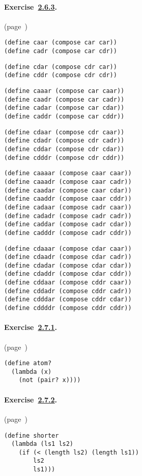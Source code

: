 \paragraph{Exercise \hyperref[start_g28]{2.6.3}. }(page \pageref{start_s96})

  
\begin{alltt}
 (define caar (compose car car))
 (define cadr (compose car cdr)) 

(define cdar (compose cdr car))
 (define cddr (compose cdr cdr)) 

(define caaar (compose car caar))
 (define caadr (compose car cadr))
 (define cadar (compose car cdar))
 (define caddr (compose car cddr)) 

(define cdaar (compose cdr caar))
 (define cdadr (compose cdr cadr))
 (define cddar (compose cdr cdar))
 (define cdddr (compose cdr cddr)) 

(define caaaar (compose caar caar))
 (define caaadr (compose caar cadr))
 (define caadar (compose caar cdar))
 (define caaddr (compose caar cddr))
 (define cadaar (compose cadr caar))
 (define cadadr (compose cadr cadr))
 (define caddar (compose cadr cdar))
 (define cadddr (compose cadr cddr)) 

(define cdaaar (compose cdar caar))
 (define cdaadr (compose cdar cadr))
 (define cdadar (compose cdar cdar))
 (define cdaddr (compose cdar cddr))
 (define cddaar (compose cddr caar))
 (define cddadr (compose cddr cadr))
 (define cdddar (compose cddr cdar))
 (define cddddr (compose cddr cddr))
\end{alltt}



\paragraph{Exercise \hyperref[start_g30]{2.7.1}. }(page \pageref{start_s126})

  
\begin{alltt}
 (define atom?
   (lambda (x)
     (not (pair? x))))
\end{alltt}



\paragraph{Exercise \hyperref[start_g31]{2.7.2}. }(page \pageref{start_s128})

  
\begin{alltt}
 (define shorter
   (lambda (ls1 ls2)
     (if (\textless{} (length ls2) (length ls1))
         ls2
         ls1)))
\end{alltt}



